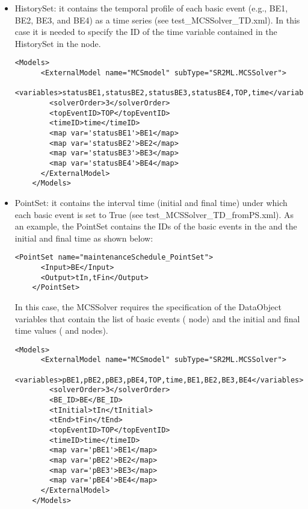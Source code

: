 \begin{itemize}
  \item HistorySet: it contains the temporal profile of each basic event (e.g., BE1, BE2, BE3, and BE4) as a time 
                    series (see test\_MCSSolver_TD.xml). In this case it is needed to specify the ID of the time variable 
                    contained in the HistorySet in the  node.
  
   \begin{lstlisting}[style=XML,morekeywords={anAttribute},caption=Time dependent (from HistorySet) MCSSolver model input example., label=lst:MCSSolver_InputExample]
     <Models>
      <ExternalModel name="MCSmodel" subType="SR2ML.MCSSolver">
        <variables>statusBE1,statusBE2,statusBE3,statusBE4,TOP,time</variables>
        <solverOrder>3</solverOrder>
        <topEventID>TOP</topEventID>
        <timeID>time</timeID>
        <map var='statusBE1'>BE1</map>
        <map var='statusBE2'>BE2</map>
        <map var='statusBE3'>BE3</map>
        <map var='statusBE4'>BE4</map>
      </ExternalModel>
    </Models>
  \end{lstlisting}
  
  \item PointSet: it contains the interval time (initial and final time) under which each basic event is set to 
                  True (see test\_MCSSolver\_TD\_fromPS.xml). As an example, the PointSet contains the IDs of the basic events
                  in the and the initial and final time as shown below:
                  
   \begin{lstlisting}[style=XML,morekeywords={anAttribute},caption= Example of PointSet for time dependent MCSSolver calculation., label=lst:MCSSolver_InputExample]
    <PointSet name="maintenanceSchedule_PointSet">
      <Input>BE</Input>
      <Output>tIn,tFin</Output>
    </PointSet>
    \end{lstlisting}
    
                  In this case, the MCSSolver requires the specification of the DataObject variables that contain the list of basic events
                  ( node) and the initial and final time values ( and  nodes).
                  
   \begin{lstlisting}[style=XML,morekeywords={anAttribute},caption=Time dependent (from PointSet) MCSSolver model input example., label=lst:MCSSolver_InputExample]
    <Models>
      <ExternalModel name="MCSmodel" subType="SR2ML.MCSSolver">
        <variables>pBE1,pBE2,pBE3,pBE4,TOP,time,BE1,BE2,BE3,BE4</variables>
        <solverOrder>3</solverOrder>
        <BE_ID>BE</BE_ID>
        <tInitial>tIn</tInitial>
        <tEnd>tFin</tEnd>
        <topEventID>TOP</topEventID>
        <timeID>time</timeID>
        <map var='pBE1'>BE1</map>
        <map var='pBE2'>BE2</map>
        <map var='pBE3'>BE3</map>
        <map var='pBE4'>BE4</map>
      </ExternalModel>
    </Models>
  \end{lstlisting}
\end{itemize}

